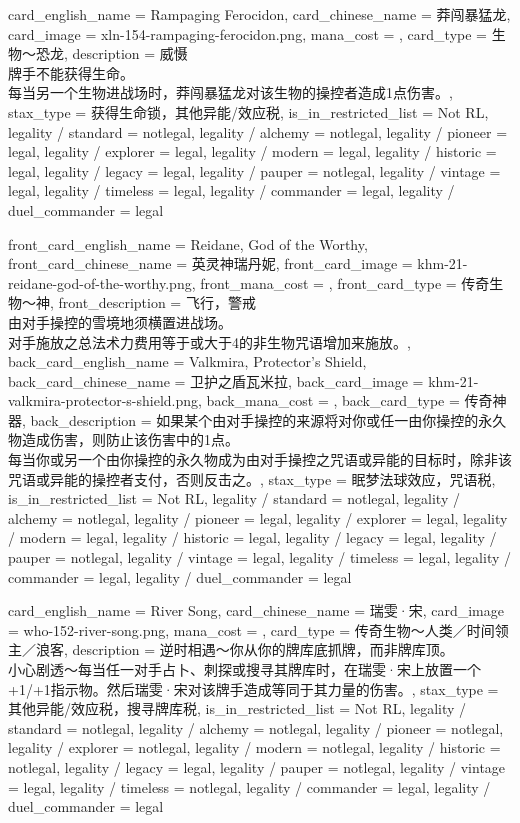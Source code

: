 \documentclass[lang = cn, color = black, 10pt]{AllThatStax}
\begin{document}
\card
{
	card_english_name = {Rampaging Ferocidon},
	card_chinese_name = {莽闯暴猛龙},
	card_image = xln-154-rampaging-ferocidon.png,
	mana_cost = ,
	card_type = 生物～恐龙,
	description = {威慑\\
牌手不能获得生命。\\
每当另一个生物进战场时，莽闯暴猛龙对该生物的操控者造成1点伤害。},
	stax_type = 获得生命锁，其他异能/效应税,
	is_in_restricted_list = Not RL,
	legality / standard = notlegal,
	legality / alchemy = notlegal,
	legality / pioneer = legal,
	legality / explorer = legal,
	legality / modern = legal,
	legality / historic = legal,
	legality / legacy = legal,
	legality / pauper = notlegal,
	legality / vintage = legal,
	legality / timeless = legal,
	legality / commander = legal,
	legality / duel_commander = legal
}

\mfcard
{
	front_card_english_name = {Reidane, God of the Worthy},
	front_card_chinese_name = {英灵神瑞丹妮},
	front_card_image = khm-21-reidane-god-of-the-worthy.png,
	front_mana_cost = ,
	front_card_type = 传奇生物～神,
	front_description = {飞行，警戒\\
由对手操控的雪境地须横置进战场。\\
对手施放之总法术力费用等于或大于4的非生物咒语增加来施放。},
	back_card_english_name = {Valkmira, Protector's Shield},
	back_card_chinese_name = {卫护之盾瓦米拉},
	back_card_image = khm-21-valkmira-protector-s-shield.png,
	back_mana_cost = ,
	back_card_type = 传奇神器,
	back_description = {如果某个由对手操控的来源将对你或任一由你操控的永久物造成伤害，则防止该伤害中的1点。\\
每当你或另一个由你操控的永久物成为由对手操控之咒语或异能的目标时，除非该咒语或异能的操控者支付，否则反击之。},
	stax_type = 眠梦法球效应，咒语税,
	is_in_restricted_list = Not RL,
	legality / standard = notlegal,
	legality / alchemy = notlegal,
	legality / pioneer = legal,
	legality / explorer = legal,
	legality / modern = legal,
	legality / historic = legal,
	legality / legacy = legal,
	legality / pauper = notlegal,
	legality / vintage = legal,
	legality / timeless = legal,
	legality / commander = legal,
	legality / duel_commander = legal
}

\card
{
	card_english_name = {River Song},
	card_chinese_name = {瑞雯·宋},
	card_image = who-152-river-song.png,
	mana_cost = ,
	card_type = 传奇生物～人类／时间领主／浪客,
	description = {逆时相遇～你从你的牌库底抓牌，而非牌库顶。\\
小心剧透～每当任一对手占卜、刺探或搜寻其牌库时，在瑞雯·宋上放置一个+1/+1指示物。然后瑞雯·宋对该牌手造成等同于其力量的伤害。},
	stax_type = 其他异能/效应税，搜寻牌库税,
	is_in_restricted_list = Not RL,
	legality / standard = notlegal,
	legality / alchemy = notlegal,
	legality / pioneer = notlegal,
	legality / explorer = notlegal,
	legality / modern = notlegal,
	legality / historic = notlegal,
	legality / legacy = legal,
	legality / pauper = notlegal,
	legality / vintage = legal,
	legality / timeless = notlegal,
	legality / commander = legal,
	legality / duel_commander = legal
}
\end{document}
